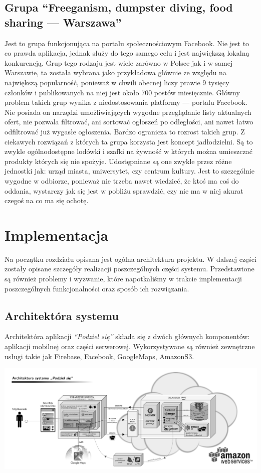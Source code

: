 \documentclass[licencjacka]{pracamgr}
\begin{document}
\section{Grupa ``Freeganism, dumpster diving, food sharing --- Warszawa''}
Jest to grupa funkcjonująca na portalu społecznościowym Facebook. Nie jest to co prawda aplikacja, jednak służy do tego samego celu i jest największą lokalną konkurencją. Grup tego rodzaju jest wiele zarówno w Polsce jak i w samej Warszawie, ta została wybrana jako przykładowa głównie ze względu na największą popularność, ponieważ w chwili obecnej liczy prawie 9 tysięcy członków i publikowanych na niej jest około 700 postów miesięcznie. Główny problem takich grup wynika z niedostosowania platformy --- portalu Facebook. Nie posiada on narzędzi umożliwiających wygodne przeglądanie listy aktualnych ofert, nie pozwala filtrować, ani sortować ogłoszeń po odległości, ani nawet łatwo odfiltrować już wygasłe ogłoszenia. Bardzo ogranicza to rozrost takich grup. Z ciekawych rozwiązań z których ta grupa korzysta jest koncept jadłodzielni. Są to zwykle ogólnodostępne lodówki i szafki na żywność w których można umieszczać produkty których się nie spożyje. Udostępniane są one zwykle przez różne jednostki jak: urząd miasta, uniwersytet, czy centrum kultury. Jest to szczególnie wygodne w odbiorze, ponieważ nie trzeba nawet wiedzieć, że ktoś ma coś do oddania, wystarczy jak się jest w pobliżu sprawdzić, czy nie ma w niej akurat czegoś na co ma się ochotę.

\chapter{Implementacja}\label{r:arch}

Na początku rozdziału opisana jest ogólna architektura projektu. W dalszej części zostały opisane szczegóły realizacji poszczególnych części systemu. Przedstawione są również problemy i wyzwanie, które napotkaliśmy w trakcie implementacji poszczególnych funkcjonalności oraz sposób ich rozwiązania.

\section{Architektóra systemu}
Architektóra aplikacji \textit{``Podziel się''} składa się z dwóch głównych komponentów: aplikacji mobilnej oraz części serwerowej. Wykorzystywane są również zewnętrzne usługi takie jak Firebase, Facebook, GoogleMaps, AmazonS3.

\includegraphics[width=\linewidth]{architektura.png}
\end{document}
